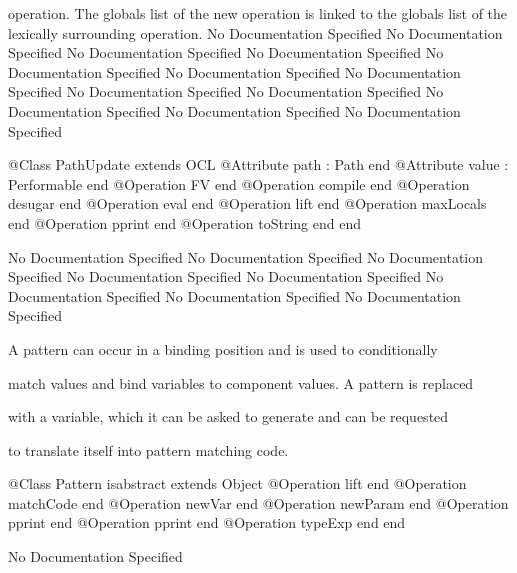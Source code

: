       operation. The globals list of the new operation is linked to the globals list of 
      the lexically surrounding operation.
No Documentation Specified
No Documentation Specified
No Documentation Specified
No Documentation Specified
No Documentation Specified
No Documentation Specified
No Documentation Specified
No Documentation Specified
No Documentation Specified
No Documentation Specified
No Documentation Specified
No Documentation Specified
\begin{Interface}
@Class PathUpdate extends OCL
  @Attribute path : Path end
  @Attribute value : Performable end
  @Operation FV end
  @Operation compile end
  @Operation desugar end
  @Operation eval end
  @Operation lift end
  @Operation maxLocals end
  @Operation pprint end
  @Operation toString end
end
\end{Interface}
No Documentation Specified
No Documentation Specified
No Documentation Specified
No Documentation Specified
No Documentation Specified
No Documentation Specified
No Documentation Specified
No Documentation Specified

      A pattern can occur in a binding position and is used to conditionally

      match values and bind variables to component values. A pattern is replaced

      with a variable, which it can be asked to generate and can be requested

      to translate itself into pattern matching code.
\begin{Interface}
@Class Pattern isabstract extends Object
  @Operation lift end
  @Operation matchCode end
  @Operation newVar end
  @Operation newParam end
  @Operation pprint end
  @Operation pprint end
  @Operation typeExp end
end
\end{Interface}
No Documentation Specified

